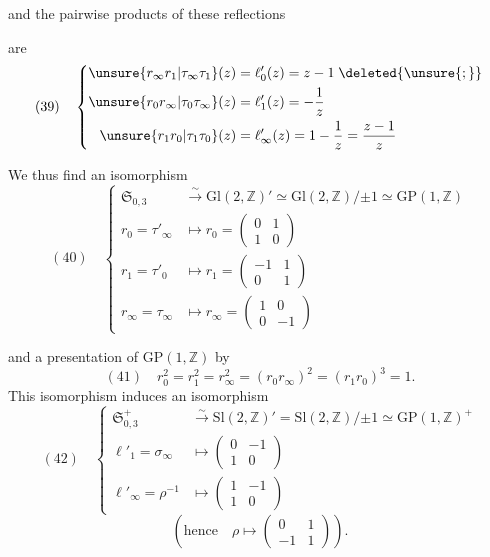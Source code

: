  and the pairwise products of these reflections


are
\[
(39)\quad\left\{\begin{aligned}
\unsure{r_\infty r_1|\tau_\infty\tau_1}(z)&=\ell'_0(z)=z-1\;\deleted{\unsure{;}}\\\unsure{r_0r_\infty|\tau_0\tau_\infty}(z)&=\ell'_1(z)=-\frac1z\\
\unsure{r_1r_0|\tau_1\tau_0}(z)&=\ell'_\infty(z)=1-\frac1z=\frac{z-1}{z}
\end{aligned}\right.
\]

We thus find an isomorphism
\[
(40)\quad\left\{\begin{aligned}
\mathfrak S_{0,3}&\xrightarrow{\sim}\mathrm{Gl}(2,\mathbb Z)'\simeq
\mathrm{Gl}(2,\mathbb Z)/\mathord{\pm}1\simeq\mathrm{GP}(1,\mathbb Z)\\
r_0=\tau'_\infty&\longmapsto r_0=\begin{pmatrix}0&1\\1&0\end{pmatrix}\\
r_1=\tau'_0&\longmapsto r_1=\begin{pmatrix}-1&1\\0&1\end{pmatrix}\\
r_\infty=\tau_\infty&\longmapsto r_\infty=\begin{pmatrix}1&0\\0&-1\end{pmatrix}
\end{aligned}\right.
\]

and a presentation of $\mathrm{GP}(1,\mathbb Z)$ by
\[
(41)\quad r_0^2=r_1^2=r_\infty^2=(r_0r_\infty)^2=(r_1r_0)^3=1.
\]
This isomorphism induces an isomorphism
\[
(42)\quad\left\{\begin{aligned}
\mathfrak S_{0,3}^{+}&\xrightarrow{\sim}
\mathrm{Sl}(2,\mathbb Z)'=\mathrm{Sl}(2,\mathbb Z)/\mathord{\pm}1
\simeq\mathrm{GP}(1,\mathbb Z)^{+}\\
\ell'_1=\sigma_\infty&\longmapsto\begin{pmatrix}0&-1\\1&0\end{pmatrix}\\
\ell'_\infty=\rho^{-1}&\longmapsto\begin{pmatrix}1&-1\\1&0\end{pmatrix}
\end{aligned}\right.
\]
\[
(\text{hence}\quad\rho\longmapsto\begin{pmatrix}0&1\\-1&1\end{pmatrix}).
\]

